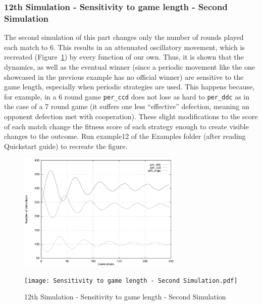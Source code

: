 \subsubsection{12th Simulation - Sensitivity to game length - Second Simulation}
The second simulation of this part changes only the number of rounds played each match to 6. This results in an attenuated oscillatory movement, which is recreated (Figure~\ref{fig:Sensitivity to game length - Second Simulation}) by every function of our own. Thus, it is shown that the dynamics, as well as the eventual winner (since a periodic movement like the one showcased in the previous example has no official winner) are sensitive to the game length, especially when periodic strategies are used. This happens because, for example, in a 6 round game \texttt{per\_ccd} does not lose as hard to \texttt{per\_ddc} as in the case of a 7 round game (it suffers one less ``effective'' defection, meaning an opponent defection met with cooperation). These slight modifications to the score of each match change the fitness score of each strategy enough to create visible changes to the outcome. Run example12 of the Examples folder (after reading Quickstart guide) to recreate the figure.
	\begin{figure}[h]
	    \centering
		\includegraphics[width=0.7\textwidth]{RefPaperFigures/fig9b.jpeg}\par\vspace{0.5em}
	    \texttt{[image: Sensitivity to game length - Second Simulation.pdf]}
	    \caption{12th Simulation - Sensitivity to game length - Second Simulation}
	    \label{fig:Sensitivity to game length - Second Simulation}
	\end{figure}
